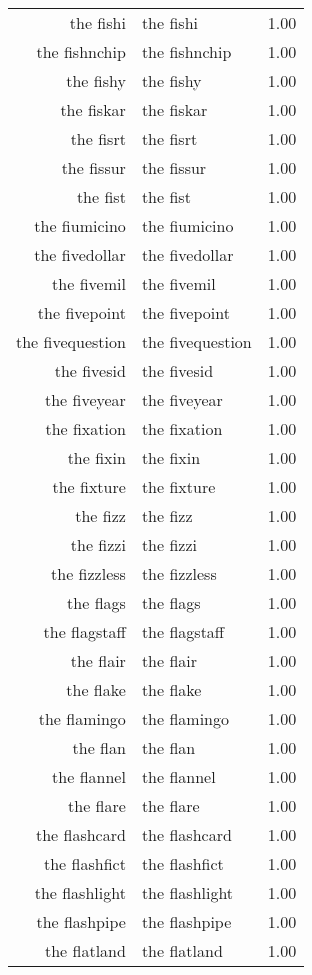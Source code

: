 \begin{table}[ht]
\begin{tabular}{rlr}
  the fishi & the fishi & 1.00 \\ 
  the fishnchip & the fishnchip & 1.00 \\ 
  the fishy & the fishy & 1.00 \\ 
  the fiskar & the fiskar & 1.00 \\ 
  the fisrt & the fisrt & 1.00 \\ 
  the fissur & the fissur & 1.00 \\ 
  the fist & the fist & 1.00 \\ 
  the fiumicino & the fiumicino & 1.00 \\ 
  the fivedollar & the fivedollar & 1.00 \\ 
  the fivemil & the fivemil & 1.00 \\ 
  the fivepoint & the fivepoint & 1.00 \\ 
  the fivequestion & the fivequestion & 1.00 \\ 
  the fivesid & the fivesid & 1.00 \\ 
  the fiveyear & the fiveyear & 1.00 \\ 
  the fixation & the fixation & 1.00 \\ 
  the fixin & the fixin & 1.00 \\ 
  the fixture & the fixture & 1.00 \\ 
  the fizz & the fizz & 1.00 \\ 
  the fizzi & the fizzi & 1.00 \\ 
  the fizzless & the fizzless & 1.00 \\ 
  the flags & the flags & 1.00 \\ 
  the flagstaff & the flagstaff & 1.00 \\ 
  the flair & the flair & 1.00 \\ 
  the flake & the flake & 1.00 \\ 
  the flamingo & the flamingo & 1.00 \\ 
  the flan & the flan & 1.00 \\ 
  the flannel & the flannel & 1.00 \\ 
  the flare & the flare & 1.00 \\ 
  the flashcard & the flashcard & 1.00 \\ 
  the flashfict & the flashfict & 1.00 \\ 
  the flashlight & the flashlight & 1.00 \\ 
  the flashpipe & the flashpipe & 1.00 \\ 
  the flatland & the flatland & 1.00 \\ 

\end{tabular}
\end{table}

